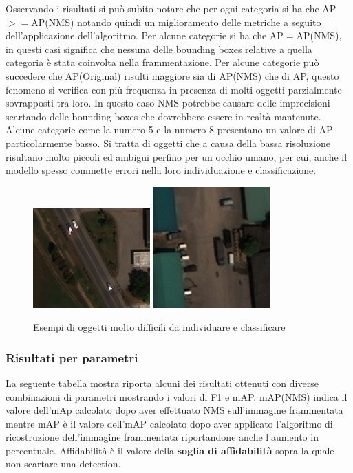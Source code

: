 Osservando i risultati si può subito notare che per ogni categoria si ha che AP$>=$AP(NMS) notando quindi un miglioramento delle metriche a seguito dell'applicazione dell'algoritmo. Per alcune categorie si ha che AP$=$AP(NMS), in questi casi significa che nessuna delle bounding boxes relative a quella categoria è stata coinvolta nella frammentazione. Per alcune categorie può succedere che AP(Original) risulti maggiore sia di AP(NMS) che di AP, questo fenomeno si verifica con più frequenza in presenza di molti oggetti parzialmente sovrapposti tra loro. In questo caso NMS potrebbe causare delle imprecisioni scartando delle bounding boxes che dovrebbero essere in realtà mantenute. Alcune categorie come la numero 5 e la numero 8 presentano un valore di AP particolarmente basso. Si tratta di oggetti che a causa della bassa risoluzione risultano molto piccoli ed ambigui perfino per un occhio umano, per cui, anche il modello spesso commette errori nella loro individuazione e classificazione.
\begin{figure}
\begin{center}
\includegraphics[width=0.4\textwidth, height=0.25\textheight]{images/auto1-satellite.jpg}
\includegraphics[width=0.4\textwidth, height=0.25\textheight]{images/auto2-satellite.jpg}
\end{center}
\caption{Esempi di oggetti molto difficili da individuare e classificare}
\end{figure}

\clearpage
\subsubsection{Risultati per parametri}
La seguente tabella mostra riporta alcuni dei risultati ottenuti con diverse combinazioni di parametri mostrando i valori di F1 e mAP. mAP(NMS) indica il valore dell'mAp calcolato dopo aver effettuato NMS sull'immagine frammentata mentre mAP è il valore dell'mAP calcolato dopo aver applicato l'algoritmo di ricostruzione dell'immagine frammentata riportandone anche l'aumento in percentuale. Affidabilità è il valore della \textbf{soglia di affidabilità} sopra la quale non scartare una detection.

